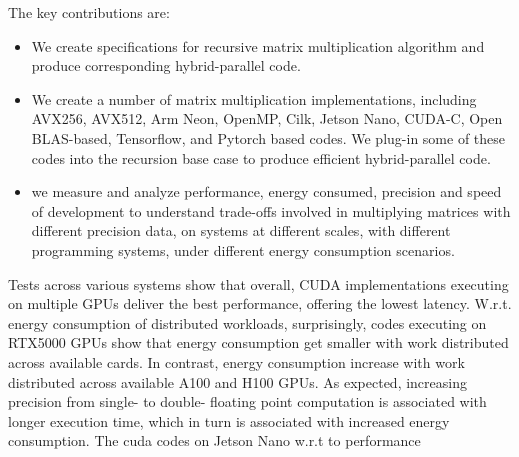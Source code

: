 The key contributions are:
\begin{itemize}
 
    \item We create specifications for recursive matrix multiplication algorithm and produce corresponding hybrid-parallel code.  
    \item We create a number of matrix multiplication implementations, including AVX256, AVX512, Arm Neon, OpenMP, Cilk, Jetson Nano, CUDA-C, Open BLAS-based, Tensorflow, and Pytorch based codes. We plug-in some of these codes into the recursion base case to produce efficient hybrid-parallel code. 
    \item we measure and analyze performance, energy consumed, precision and speed of development to understand trade-offs involved in multiplying matrices with different precision data, on systems at different scales, with different programming systems, under different energy consumption scenarios. 
\end{itemize}

Tests across various systems show that overall, CUDA implementations executing on multiple GPUs deliver the best performance, offering the lowest latency. W.r.t. energy consumption of distributed workloads, surprisingly, codes executing on RTX5000 GPUs show that energy consumption get smaller with work distributed across available cards. In contrast, energy consumption increase with work distributed across available A100 and H100 GPUs.  As expected, increasing precision from single- to double- floating point computation is associated with longer execution time, which in turn is associated with increased energy consumption. The cuda codes on Jetson Nano w.r.t to performance %
